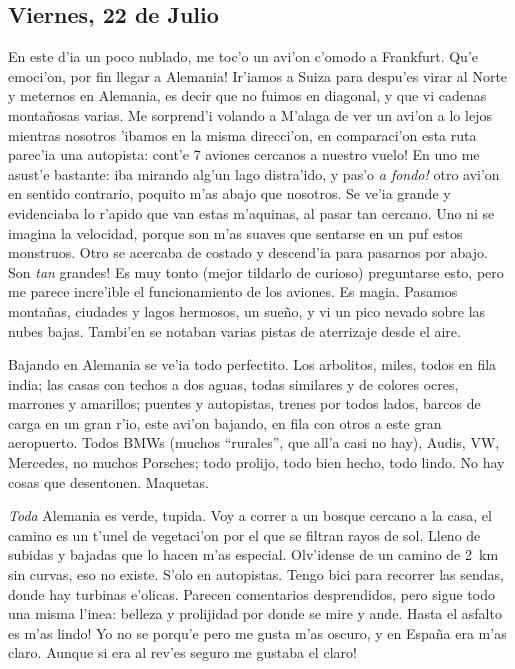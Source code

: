 \subsection*{Viernes, 22 de Julio}

En este d'ia un poco nublado, me toc'o un avi'on c'omodo a Frankfurt.
\textexclamdown Qu'e emoci'on, por fin llegar a Alemania! Ir'iamos a Suiza para
despu'es virar al Norte y meternos en Alemania, es decir que no fuimos en
diagonal, y que vi cadenas monta\~nosas varias. Me sorprend'i volando a M'alaga
de ver un avi'on a lo lejos mientras nosotros 'ibamos en la misma direcci'on, en
comparaci'on esta ruta parec'ia una autopista: \textexclamdown cont'e 7 aviones
cercanos a nuestro vuelo! En uno me asust'e bastante: iba mirando alg'un lago
distra'ido, y pas'o \emph{\textexclamdown a fondo!} otro avi'on en sentido
contrario, poquito m'as abajo que nosotros. Se ve'ia grande y evidenciaba lo
r'apido que van estas m'aquinas, al pasar tan cercano. Uno ni se imagina la
velocidad, porque son m'as suaves que sentarse en un puf estos monstruos. Otro
se acercaba de costado y descend'ia para pasarnos por abajo. \textexclamdown Son
\emph{tan} grandes! Es muy tonto (mejor tildarlo de curioso) preguntarse esto,
pero me parece incre'ible el funcionamiento de los aviones. Es magia. Pasamos
monta\~nas, ciudades y lagos hermosos, un sue\~no, y vi un pico nevado sobre las
nubes bajas. Tambi'en se notaban varias pistas de aterrizaje desde el aire.

Bajando en Alemania se ve'ia todo perfectito. Los arbolitos, miles, todos en
fila india; las casas con techos a dos aguas, todas similares y de colores
ocres, marrones y amarillos; puentes y autopistas, trenes por todos lados,
barcos de carga en un gran r'io, este avi'on bajando, en fila con otros a este
gran aeropuerto. Todos {\small BMW}s (muchos ``rurales'', que all'a casi no
hay), Audis, {\small VW}, Mercedes, no muchos Porsches; todo prolijo, todo bien
hecho, todo lindo. No hay cosas que desentonen. Maquetas.

\emph{Toda} Alemania es verde, tupida. Voy a correr a un bosque cercano a la
casa, el camino es un t'unel de vegetaci'on por el que se filtran rayos de sol.
Lleno de subidas y bajadas que lo hacen m'as especial. Olv'idense de un camino
de 2~km sin curvas, eso no existe. S'olo en autopistas. Tengo bici para recorrer
las sendas, donde hay turbinas e'olicas. Parecen comentarios desprendidos, pero
sigue todo una misma l'inea: belleza y prolijidad por donde se mire y ande.
\textexclamdown Hasta el asfalto es m'as lindo! Yo no se porqu'e pero me gusta
m'as oscuro, y en Espa\~na era m'as claro. \textexclamdown Aunque si era al
rev'es seguro me gustaba el claro!

